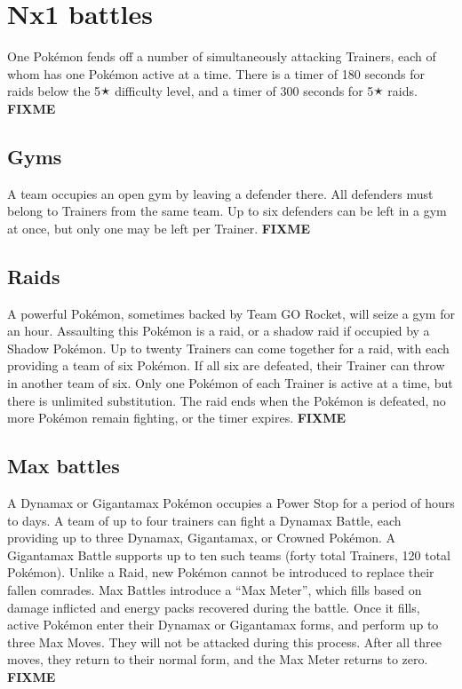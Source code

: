\section{Nx1 battles}
\label{sec:nx1}
One Pokémon fends off a number of simultaneously attacking Trainers,
  each of whom has one Pokémon active at a time.
There is a timer of 180 seconds for raids below the 5🟉 difficulty level,
  and a timer of 300 seconds for 5🟉 raids.
\textbf{FIXME}

\subsection{Gyms}
\label{sec:gyms}
A team occupies an open gym by leaving a defender there.
All defenders must belong to Trainers from the same team.
Up to six defenders can be left in a gym at once, but only one
  may be left per Trainer.
\textbf{FIXME}

\subsection{Raids}
\label{sec:raids}
A powerful Pokémon, sometimes backed by Team GO Rocket, will seize a gym for an hour.
Assaulting this Pokémon is a raid, or a shadow raid if occupied by a Shadow Pokémon.
Up to twenty Trainers can come together for a raid, with each providing a team of six Pokémon.
If all six are defeated, their Trainer can throw in another team of six.
Only one Pokémon of each Trainer is active at a time, but there is unlimited substitution.
The raid ends when the Pokémon is defeated, no more Pokémon remain fighting,
  or the timer expires.
\textbf{FIXME}

\subsection{Max battles}
\label{sec:maxbattles}
A Dynamax or Gigantamax Pokémon occupies a Power Stop for a period of hours to days.
A team of up to four trainers can fight a Dynamax Battle, each providing up to
  three Dynamax, Gigantamax, or Crowned Pokémon.
A Gigantamax Battle supports up to ten such teams (forty total Trainers, 120 total Pokémon).
Unlike a Raid, new Pokémon cannot be introduced to replace their fallen comrades.
Max Battles introduce a ``Max Meter'', which fills based on damage inflicted and
  energy packs recovered during the battle.
Once it fills, active Pokémon enter their Dynamax or Gigantamax forms, and perform
  up to three Max Moves.
They will not be attacked during this process.
After all three moves, they return to their normal form,
  and the Max Meter returns to zero.
\textbf{FIXME}

